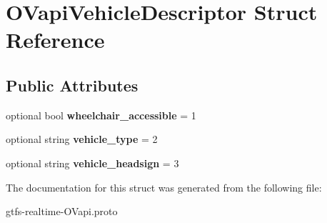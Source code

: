 \hypertarget{structOVapiVehicleDescriptor}{}\section{O\+Vapi\+Vehicle\+Descriptor Struct Reference}
\label{structOVapiVehicleDescriptor}
\subsection*{Public Attributes}
\begin{DoxyCompactItemize}
\item 
optional bool {\bfseries wheelchair\+\_\+accessible} = 1\hypertarget{structOVapiVehicleDescriptor_a19d669b1880f76ed0237358abec182c0}{}\label{structOVapiVehicleDescriptor_a19d669b1880f76ed0237358abec182c0}

\item 
optional string {\bfseries vehicle\+\_\+type} = 2\hypertarget{structOVapiVehicleDescriptor_aea3fa01dadecb532d365a7d542645a54}{}\label{structOVapiVehicleDescriptor_aea3fa01dadecb532d365a7d542645a54}

\item 
optional string {\bfseries vehicle\+\_\+headsign} = 3\hypertarget{structOVapiVehicleDescriptor_ab2c42e7ce95f302bd036743cc63d7e4f}{}\label{structOVapiVehicleDescriptor_ab2c42e7ce95f302bd036743cc63d7e4f}

\end{DoxyCompactItemize}


The documentation for this struct was generated from the following file\+:\begin{DoxyCompactItemize}
\item 
gtfs-\/realtime-\/\+O\+Vapi.\+proto\end{DoxyCompactItemize}
